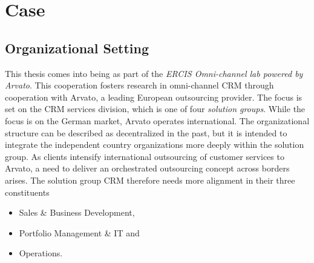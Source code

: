 \chapter{Case}
\section{Organizational Setting}
This thesis comes into being as part of the \textit{ERCIS Omni-channel lab powered by Arvato}. This cooperation fosters research in omni-channel CRM through cooperation with Arvato, a leading European outsourcing provider. The focus is set on the CRM services division, which is one of four \textit{solution groups}. While the focus is on the German market, Arvato operates international. The organizational structure can be described as decentralized in the past, but it is intended to integrate the independent country organizations more deeply within the solution group. As clients intensify international outsourcing of customer services to Arvato, a need to deliver an orchestrated outsourcing concept across borders arises. The solution group CRM therefore needs more alignment in their three constituents

\begin{itemize}
	\item Sales \& Business Development,
	\item Portfolio Management \& IT and
	\item Operations.
\end{itemize}

